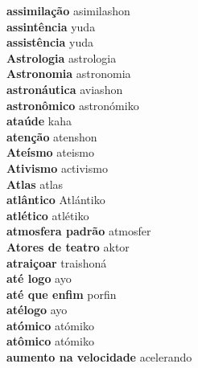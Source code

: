 \textbf{ assimilação  } asimilashon \\
\textbf{ assintência  } yuda \\
\textbf{ assistência  } yuda \\
\textbf{ Astrologia  } astrologia \\
\textbf{ Astronomia  } astronomia \\
\textbf{ astronáutica  } aviashon \\
\textbf{ astronômico  } astronómiko \\
\textbf{ ataúde  } kaha \\
\textbf{ atenção  } atenshon \\
\textbf{ Ateísmo  } ateismo \\
\textbf{ Ativismo  } activismo \\
\textbf{ Atlas  } atlas \\
\textbf{ atlântico  } Atlántiko \\
\textbf{ atlético  } atlétiko \\
\textbf{ atmosfera padrão  } atmosfer \\
\textbf{ Atores de teatro  } aktor \\
\textbf{ atraiçoar  } traishoná \\
\textbf{ até logo  } ayo \\
\textbf{ até que enfim  } porfin \\
\textbf{ atélogo  } ayo \\
\textbf{ atómico  } atómiko \\
\textbf{ atômico  } atómiko \\
\textbf{ aumento na velocidade  } acelerando \\
